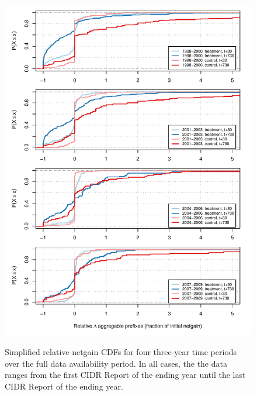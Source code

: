 \clearpage
\begin{figure}[H]
\begin{centering}
\begin{singlespace}
\captionsetup{list=no}
    \includegraphics[width=6in]
        {figures/behavior-rel_netgain-vseries-special_tc.pdf}
    \vspace{-2em}\\
    \caption{Simplified relative netgain CDFs for four three-year time
    periods over the full data availability period. In all cases, the the data
    ranges from the first CIDR Report of the ending year until the last CIDR
    Report of the ending year.}
\end{singlespace}
\end{centering}
\end{figure}

